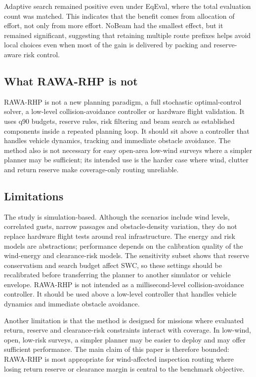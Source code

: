 \documentclass[preprint,12pt]{elsarticle}
\begin{document}
Adaptive search remained positive even under EqEval, where the total evaluation count was matched. This indicates that the benefit comes from allocation of effort, not only from more effort. NoBeam had the smallest effect, but it remained significant, suggesting that retaining multiple route prefixes helps avoid local choices even when most of the gain is delivered by packing and reserve-aware risk control.

\subsection{What RAWA-RHP is not}

RAWA-RHP is not a new planning paradigm, a full stochastic optimal-control solver, a low-level collision-avoidance controller or hardware flight validation. It uses q90 budgets, reserve rules, risk filtering and beam search as established components inside a repeated planning loop. It should sit above a controller that handles vehicle dynamics, tracking and immediate obstacle avoidance. The method also is not necessary for easy open-area low-wind surveys where a simpler planner may be sufficient; its intended use is the harder case where wind, clutter and return reserve make coverage-only routing unreliable.

\subsection{Limitations}

The study is simulation-based. Although the scenarios include wind levels, correlated gusts, narrow passages and obstacle-density variation, they do not replace hardware flight tests around real infrastructure. The energy and risk models are abstractions; performance depends on the calibration quality of the wind-energy and clearance-risk models. The sensitivity subset shows that reserve conservatism and search budget affect SWC, so these settings should be recalibrated before transferring the planner to another simulator or vehicle envelope. RAWA-RHP is not intended as a millisecond-level collision-avoidance controller. It should be used above a low-level controller that handles vehicle dynamics and immediate obstacle avoidance.

Another limitation is that the method is designed for missions where evaluated return, reserve and clearance-risk constraints interact with coverage. In low-wind, open, low-risk surveys, a simpler planner may be easier to deploy and may offer sufficient performance. The main claim of this paper is therefore bounded: RAWA-RHP is most appropriate for wind-affected inspection routing where losing return reserve or clearance margin is central to the benchmark objective.
\end{document}
